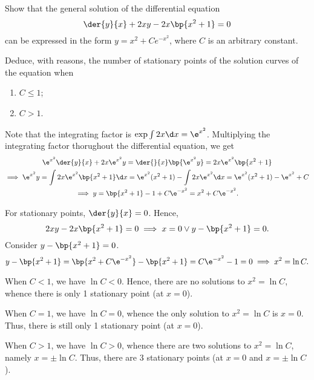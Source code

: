 \begin{problem}
    Show that the general solution of the differential equation \[\der{y}{x} + 2xy - 2x \bp{x^2 + 1} = 0\] can be expressed in the form $y = x^2 + Ce^{-x^2}$, where $C$ is an arbitrary constant.
        
    Deduce, with reasons, the number of stationary points of the solution curves of the equation when
    \begin{enumerate}
        \item $C \leq 1$;
        \item $C > 1$.
    \end{enumerate}
\end{problem}
\begin{solution}
    Note that the integrating factor is $\exp{ \int 2x \d x} = \e^{x^2}$. Multiplying the integrating factor thorughout the differential equation, we get
    \begin{gather*}
        \e^{x^2}\der{y}{x} + 2x\e^{x^2}y = \der{}{x} \bp{\e^{x^2} y} = 2x\e^{x^2} \bp{x^2 + 1} \\
        \implies \e^{x^2} y = \int 2x\e^{x^2} \bp{x^2 + 1} \d x = \e^{x^2}(x^2 + 1) - \int 2x \e^{x^2} \d x = \e^{x^2} (x^2 + 1) - \e^{x^2} + C\\
        \implies y = \bp{x^2 + 1} - 1 + C\e^{-x^2} = x^2 + C\e^{-x^2}.
    \end{gather*}

    For stationary points, $\der{y}{x} = 0$. Hence, \[2xy - 2x\bp{x^2 + 1} = 0 \implies x = 0 \lor y - \bp{x^2 + 1} = 0.\] Consider $y - \bp{x^2 + 1} = 0$. \[y - \bp{x^2 + 1} = \bp{x^2 + C\e^{-x^2}} - \bp{x^2 + 1} = C\e^{-x^2} - 1 = 0 \implies x^2 = \ln C.\]

    \begin{ppart}
        When $C < 1$, we have $\ln C < 0$. Hence, there are no solutions to $x^2 = \ln C$, whence there is only 1 stationary point (at $x = 0$).

        When $C = 1$, we have $\ln C = 0$, whence the only solution to $x^2 = \ln C$ is $x = 0$. Thus, there is still only 1 stationary point (at $x = 0$).
    \end{ppart}
    \begin{ppart}
        When $C > 1$, we have $\ln C > 0$, whence there are two solutions to $x^2 = \ln C$, namely $x = \pm \ln C$. Thus, there are 3 stationary points (at $x = 0$ and $x = \pm \ln C$).
    \end{ppart}
\end{solution}

